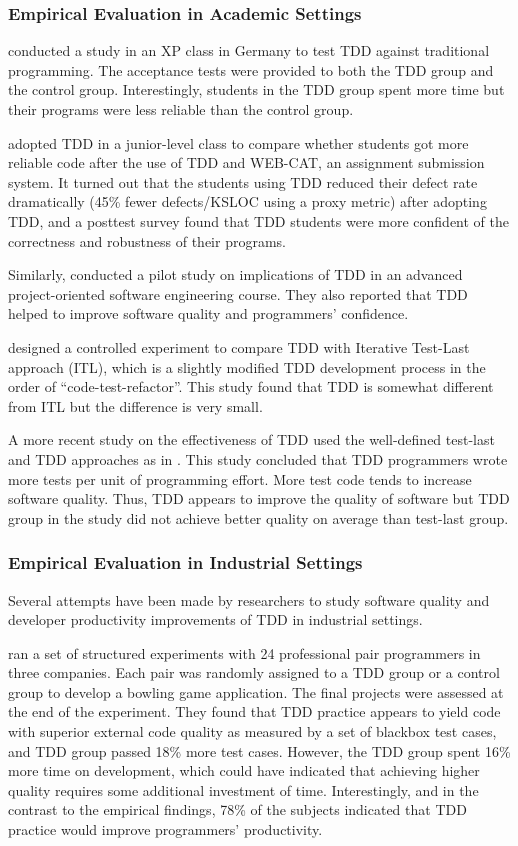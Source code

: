 \documentclass[smallextended]{svjour3}     %
\begin{document}
\subsubsection{Empirical Evaluation in Academic Settings}

\cite{Muller:02} conducted a study in an XP class in
Germany to test TDD against traditional programming.  The acceptance tests
were provided to both the TDD group and the control group. Interestingly,
students in the TDD group spent more time but their programs were less
reliable than the control group.

\cite{Edwards:04} adopted TDD in a junior-level class to compare
whether students got more reliable code after the use of TDD and WEB-CAT,
an assignment submission system. It turned out that the students using TDD
reduced their defect rate dramatically (45\% fewer defects/KSLOC using a
proxy metric) after adopting TDD, and a posttest survey found that TDD
students were more confident of the correctness and robustness of their
programs.

Similarly, \cite{Kaufmann:03} conducted a pilot study
on implications of TDD in an advanced project-oriented software engineering
course. They also reported that TDD helped to improve software quality and
programmers' confidence.

\cite{Matjaz:03} designed a controlled experiment to compare TDD with
Iterative Test-Last approach (ITL), which is a slightly modified TDD
development process in the order of ``code-test-refactor''.  This study
found that TDD is somewhat different from ITL but the difference is very
small.

A more recent study on the effectiveness of TDD 
\citep{Erdogmus:05} used the well-defined test-last
and TDD approaches as in \cite{Matjaz:03}. This study
concluded that TDD programmers wrote more tests per unit of programming
effort. More test code tends to increase software quality. Thus, TDD
appears to improve the quality of software but TDD group in the study did
not achieve better quality on average than test-last group.

\subsubsection{Empirical Evaluation in Industrial Settings}
Several attempts have been made by researchers to study software quality
and developer productivity improvements of TDD in industrial settings.  

\cite{George:04} ran a set of structured experiments
with 24 professional pair programmers in three companies. Each pair was
randomly assigned to a TDD group or a control group to develop a bowling
game application. The final projects were assessed at the end of the
experiment.  They found that TDD practice appears to yield code with
superior external code quality as measured by a set of blackbox test cases,
and TDD group passed 18\% more test cases. However, the TDD group spent
16\% more time on development, which could have indicated that achieving
higher quality requires some additional investment of time. Interestingly,
and in the contrast to the empirical findings, 78\% of the subjects
indicated that TDD practice would improve programmers' productivity.
\end{document}
